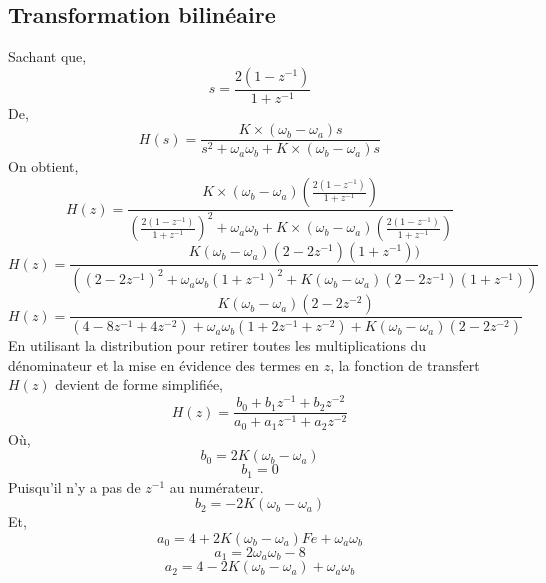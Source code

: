 \documentclass{article}
\begin{document}
\subsection{Transformation bilinéaire}
Sachant que,
\begin{equation}
s = \frac{2(1-z^{-1})}{1+z^{-1}}
\end{equation}
De,
\begin{equation}
H(s) = \frac{K \times (\omega_b - \omega_a)s}{s^2 + \omega_a \omega_b+K \times (\omega_b - \omega_a)s}
\end{equation}
On obtient,
\begin{equation}
H(z) = \frac{K \times (\omega_b - \omega_a)(\frac{2(1-z^{-1})}{1+z^{-1}})}{(\frac{2(1-z^{-1})}{1+z^{-1}})^2 + \omega_a \omega_b+K \times (\omega_b - \omega_a)(\frac{2(1-z^{-1})}{1+z^{-1}})}
\end{equation}
\begin{equation}
H(z) = \frac{K (\omega_b - \omega_a)(2-2z^{-1})(1+z^{-1}))}{((2-2z^{-1})^2 + \omega_a \omega_b (1+z^{-1})^2 + K(\omega_b - \omega_a)(2-2z^{-1})(1+z^{-1}))}
\end{equation}
\begin{equation}
H(z) = \frac{K (\omega_b - \omega_a)(2-2z^{-2})}{(4-8z^{-1}+4z^{-2}) + \omega_a \omega_b (1+2z^{-1}+z^{-2}) + K(\omega_b - \omega_a)(2-2z^{-2})}
\end{equation}
En utilisant la distribution pour retirer toutes les multiplications du dénominateur et la mise en évidence des termes en $z$, la fonction de transfert $H(z)$ devient de forme simplifiée,
\begin{equation}
H(z) = \frac{b_0 + b_1z^{-1} + b_2z^{-2}}{a_0 + a_1z^{-1}+a_2z^{-2}}
\end{equation}
Où,
\begin{equation}
b_0 = 2K(\omega_b - \omega_a)
\end{equation}
\begin{equation}
b_1 = 0
\end{equation}
Puisqu'il n'y a pas de $z^{-1}$ au numérateur.
\begin{equation}
b_2 = -2K(\omega_b - \omega_a)
\end{equation}
Et,
\begin{equation}
a_0 = 4 + 2K(\omega_b - \omega_a)Fe + \omega_a \omega_b
\end{equation}
\begin{equation}
a_1 = 2\omega_a \omega_b - 8
\end{equation}
\begin{equation}
a_2 = 4 - 2K(\omega_b - \omega_a) + \omega_a \omega_b
\end{equation}
\end{document}
